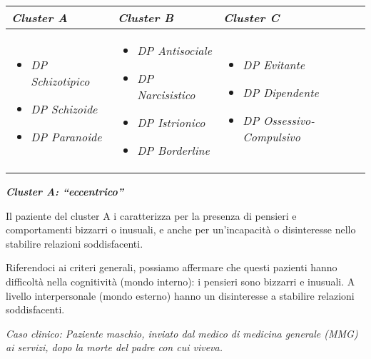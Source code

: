 \documentclass[]{article}
\begin{document}
\begin{longtable}[]{@{}lll@{}}
\toprule
\textbf{\emph{Cluster A}} & \textbf{\emph{Cluster B}} &
\textbf{\emph{Cluster C}}\tabularnewline
\midrule
\endhead
\begin{minipage}[t]{0.32\columnwidth}\raggedright\strut
\begin{itemize}
\item
  \emph{DP Schizotipico}
\item
  \emph{DP Schizoide}
\item
  \emph{DP Paranoide}
\end{itemize}\strut
\end{minipage} & \begin{minipage}[t]{0.32\columnwidth}\raggedright\strut
\begin{itemize}
\item
  \emph{DP Antisociale}
\item
  \emph{DP Narcisistico}
\item
  \emph{DP Istrionico}
\item
  \emph{DP Borderline}
\end{itemize}\strut
\end{minipage} & \begin{minipage}[t]{0.32\columnwidth}\raggedright\strut
\begin{itemize}
\item
  \emph{DP Evitante}
\item
  \emph{DP Dipendente}
\item
  \emph{DP Ossessivo-Compulsivo}
\end{itemize}\strut
\end{minipage}\tabularnewline
\bottomrule
\end{longtable}

\textbf{\emph{Cluster A: ``eccentrico''}}

Il paziente del cluster A i caratterizza per la presenza di pensieri e
comportamenti bizzarri o inusuali, e anche per un'incapacità o
disinteresse nello stabilire relazioni soddisfacenti.

Riferendoci ai criteri generali, possiamo affermare che questi pazienti
hanno difficoltà nella cognitività (mondo interno): i pensieri sono
bizzarri e inusuali. A livello interpersonale (mondo esterno) hanno un
disinteresse a stabilire relazioni soddisfacenti.

\emph{Caso clinico: Paziente maschio, inviato dal medico di medicina
generale (MMG) ai servizi, dopo la morte del padre con cui viveva.}
\end{document}
